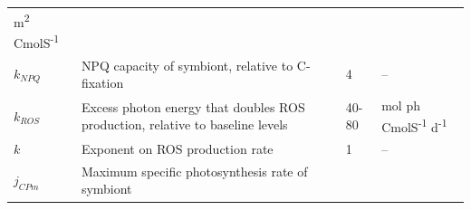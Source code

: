\documentclass[]{elsarticle} %
\begin{document}
\begin{longtable}[c]{@{}llll@{}}
\begin{minipage}[t]{0.23\columnwidth}
m\textsuperscript{2} CmolS\textsuperscript{-1}
\strut\end{minipage}\tabularnewline
\begin{minipage}[t]{0.10\columnwidth}\raggedright\strut
\(k_{NPQ}\)
\strut\end{minipage} &
\begin{minipage}[t]{0.48\columnwidth}\raggedright\strut
NPQ capacity of symbiont, relative to C-fixation
\strut\end{minipage} &
\begin{minipage}[t]{0.09\columnwidth}\raggedright\strut
4
\strut\end{minipage} &
\begin{minipage}[t]{0.23\columnwidth}\raggedright\strut
--
\strut\end{minipage}\tabularnewline
\begin{minipage}[t]{0.10\columnwidth}\raggedright\strut
\(k_{ROS}\)
\strut\end{minipage} &
\begin{minipage}[t]{0.48\columnwidth}\raggedright\strut
Excess photon energy that doubles ROS production, relative to baseline
levels
\strut\end{minipage} &
\begin{minipage}[t]{0.09\columnwidth}\raggedright\strut
40-80
\strut\end{minipage} &
\begin{minipage}[t]{0.23\columnwidth}\raggedright\strut
mol ph CmolS\textsuperscript{-1} d\textsuperscript{-1}
\strut\end{minipage}\tabularnewline
\begin{minipage}[t]{0.10\columnwidth}\raggedright\strut
\(k\)
\strut\end{minipage} &
\begin{minipage}[t]{0.48\columnwidth}\raggedright\strut
Exponent on ROS production rate
\strut\end{minipage} &
\begin{minipage}[t]{0.09\columnwidth}\raggedright\strut
1
\strut\end{minipage} &
\begin{minipage}[t]{0.23\columnwidth}\raggedright\strut
--
\strut\end{minipage}\tabularnewline
\begin{minipage}[t]{0.10\columnwidth}\raggedright\strut
\(j_{CPm}\)
\strut\end{minipage} &
\begin{minipage}[t]{0.48\columnwidth}\raggedright\strut
Maximum specific photosynthesis rate of symbiont

\end{minipage}
\end{longtable}
\end{document}
